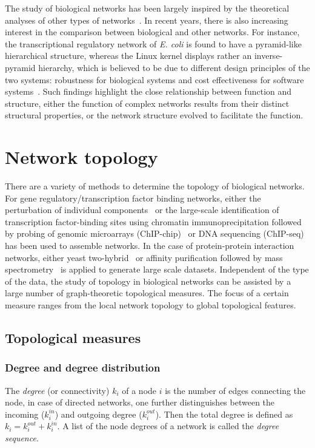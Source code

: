 The study of biological networks has been largely inspired by the theoretical 
analyses of other types of networks~\citep{Barabasi2004}. In recent years, 
there is also increasing interest in the comparison between biological and
other networks. For instance, the transcriptional regulatory network of 
\emph{E. coli} is found to have a pyramid-like hierarchical 
structure, whereas the Linux kernel displays rather an inverse-pyramid
hierarchy, which is believed to be due to different design principles of the two 
systems: robustness for biological systems and cost effectiveness for 
software systems~\citep{Yan2010}.
Such findings highlight the close relationship between 
function and structure, either
the function of complex networks results from their distinct structural 
properties, or the network structure evolved to facilitate
the function.

\section{Network topology}
There are a variety of methods to determine the topology of biological
networks. For gene regulatory/transcription factor binding networks,
either the perturbation of individual components~\citep{Davidson2002} or
the large-scale identification of transcription factor-binding sites 
using chromatin immunoprecipitation followed by probing of genomic microarrays 
(ChIP-chip)~\citep{Horak2002b} or DNA sequencing (ChIP-seq)~\citep{Johnson2007} 
has been used to assemble networks.
In the case of protein-protein interaction networks, either yeast two-hybrid~%
\citep{Uetz2000,Ito2001}
or affinity purification followed by mass spectrometry~\citep{Gavin2006} is applied to 
generate large scale datasets. 
Independent of the type of the data, the study of topology in biological networks
can be assisted by
a large number of graph-theoretic topological measures.
The focus of a certain measure ranges from the local network topology to 
global topological features.

\subsection{Topological measures}
\label{sec:topology_definition}

\subsubsection{Degree and degree distribution}
The \emph{degree} (or connectivity) $k_i$ of a node $i$ is the number of edges 
connecting the node, in case of directed networks, one further distinguishes
between the incoming ($k_i^{in}$) and outgoing degree ($k_i^{out}$). Then the total 
degree is defined as $k_i = k_i^{out} + k_i^{in}$. A list of the node degrees 
of a network is called the \emph{degree sequence}.

